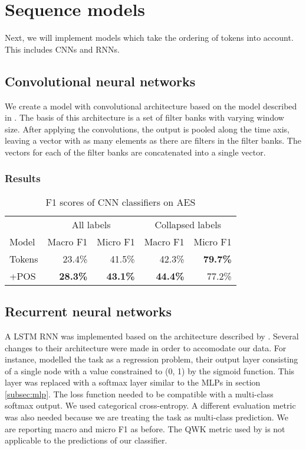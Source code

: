 \chapter{Sequence models}

Next, we will implement models which take the ordering of tokens into account.
This includes \acp{CNN} and \acp{RNN}. 


\section{Convolutional neural networks}

We create a model with convolutional architecture based on the model
described in \textcite{zhang2017sensitivity}. The basis of this architecture is
a set of filter banks with varying window size. After applying the convolutions,
the output is pooled along the time axis, leaving a vector with as many elements
as there are filters in the filter banks. The vectors for each of the filter
banks are concatenated into a single vector.


\subsection{Results}

\begin{table}
  \centering
  \begin{tabular}{|l|rr|rr|}
    \toprule
            & \multicolumn{2}{c|}{All labels} & \multicolumn{2}{c|}{Collapsed labels} \\
    Model     & Macro F1        & Micro F1        & Macro F1        & Micro F1        \\
    \midrule
    Tokens    &         23.4\%  &         41.5\%  &         42.3\%  & \textbf{79.7\%} \\
    +POS      & \textbf{28.3\%} & \textbf{43.1\%} & \textbf{44.4\%} &         77.2\%  \\
    \bottomrule
  \end{tabular}
  \caption{F1 scores of CNN classifiers on AES}
  \label{cnn-results}
\end{table}

\section{Recurrent neural networks}

A \ac{LSTM} \ac{RNN} was implemented based on the architecture described by
\textcite{taghipour16}. Several changes to their architecture were made in
order to accomodate our data. For instance, \citeauthor{taghipour16} modelled
the task as a regression problem, their output layer consisting of a single
node with a value constrained to (0, 1) by the sigmoid function. This layer
was replaced with a softmax layer similar to the \acp{MLP} in section
\ref{subsec:mlp}. The loss function needed to be compatible with a
multi-class softmax output. We used categorical cross-entropy. A different
evaluation metric was also needed because we are treating the task as
multi-class prediction. We are reporting macro and micro F1 as before. The
\ac{QWK} metric used by \citeauthor{taghipour16} is not applicable to the
predictions of our classifier.

